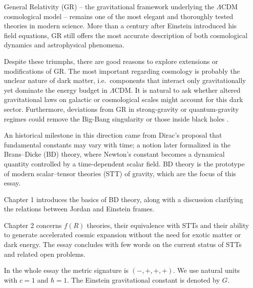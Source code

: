 General Relativity (GR) -- the gravitational framework underlying the $\Lambda$CDM cosmological model -- remains one of the most elegant and thoroughly tested theories in modern science. More than a century after Einstein introduced his field equations, GR still offers the most accurate description of both cosmological dynamics and astrophysical phenomena. 

Despite these triumphs, there are good reasons to explore extensions or modifications of GR. The most important regarding cosmology is probably the unclear nature of dark matter, i.e.\ components that interact only gravitationally yet dominate the energy budget in $\Lambda$CDM. It is natural to ask whether altered gravitational laws on galactic or cosmological scales might account for this dark sector. 
Furthermore, deviations from GR in strong-gravity or quantum-gravity regimes could remove the Big-Bang singularity or those inside black holes \cite{Braglia:2021axy}.

An historical milestone in this direction came from Dirac’s proposal that fundamental constants may vary with time; a notion later formalized in the Brans–Dicke (BD) theory, where Newton’s constant becomes a dynamical quantity controlled by a time-dependent scalar field. BD theory is the prototype of modern scalar–tensor theories (STT) of gravity, which are the focus of this essay.

Chapter 1 introduces the basics of BD theory, along with a discussion clarifying the relations between Jordan and Einstein frames.

Chapter 2 concerns $f(R)$ theories, their equivalence with STTs and their ability to generate accelerated cosmic expansion without the need for exotic matter or dark energy. 
The essay concludes with few words on the current status of STTs and related open problems.

In the whole essay the metric signature is $(-,+,+,+)$. We use natural units with $c=1$ and $\hbar=1$. The Einstein gravitational constant is denoted by $G$.
